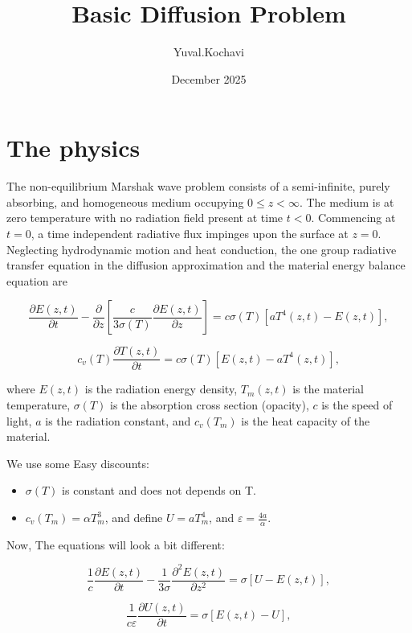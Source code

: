 \documentclass{article}
\title{Basic Diffusion Problem}
\author{Yuval.Kochavi }
\date{December 2025}
\begin{document}
\maketitle

\section{The physics}
The non-equilibrium Marshak wave problem consists of a semi-infinite, purely absorbing, and homogeneous medium occupying $0 \leq z < \infty$. The medium is at zero temperature with no radiation field present at time $t < 0$. Commencing at $t = 0$, a time independent radiative flux impinges upon the surface at $z = 0$. Neglecting hydrodynamic motion and heat conduction, the one group radiative transfer equation in the diffusion approximation and the material energy balance equation are

\begin{equation}
\frac{\partial E(z,t)}{\partial t} - \frac{\partial}{\partial z}\left[\frac{c}{3\sigma(T)}\frac{\partial E(z,t)}{\partial z}\right] = c\sigma(T)[aT^4(z,t) - E(z,t)],
\end{equation}

\begin{equation}
c_v(T)\frac{\partial T(z,t)}{\partial t} = c\sigma(T)[E(z,t) - aT^4(z,t)],
\end{equation}

where $E(z,t)$ is the radiation energy density, $T_m(z,t)$ is the material temperature, $\sigma(T)$ is the absorption cross section (opacity), $c$ is the speed of light, $a$ is the radiation constant, and $c_v(T_m)$ is the heat capacity of the material. 

We use some Easy discounts: 

\begin{itemize}
\item $\sigma(T)$ is constant and does not depends on T.
\item $c_v(T_m) = \alpha T_m^3$, and define $U = aT_m^4$, and $\varepsilon = \frac{4a}{\alpha}$.
\end{itemize}

Now, The equations will look a bit different: 

\begin{equation}
\frac{1}{c}\frac{\partial E(z,t)}{\partial t} - \frac{1}{3\sigma}\frac{\partial^2E(z,t)}{\partial z^2} = \sigma[U - E(z,t)],
\end{equation}

\begin{equation}
\frac{1}{c\varepsilon}\frac{\partial U(z,t)}{\partial t} = \sigma[E(z,t) - U],
\end{equation}
\end{document}
